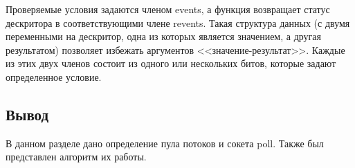 Проверяемые условия задаются членом events, а функция возвращает статус дескритора в соответствующими члене revents.
Такая структура данных (с двумя переменными на дескритор, одна из которых является значением, а другая результатом)
позволяет избежать аргументов <<значение-результат>>.
Каждые из этих двух членов состоит из одного или нескольких битов, которые задают определенное условие.


\subsection*{Вывод}

В данном разделе дано определение пула потоков и сокета poll.
Также был представлен алгоритм их работы.
